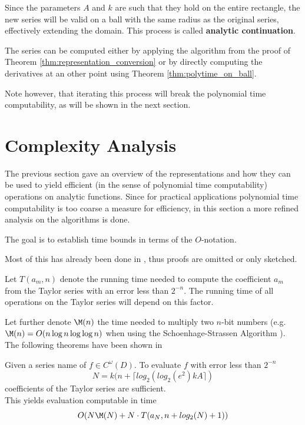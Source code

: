 		Since the parameters $A$ and $k$ are such that they hold on the entire rectangle, 
		the new series will be valid on a ball with the same radius as the original series, effectively extending the domain.
		This process is called \textbf{analytic continuation}.
		
    The series can be computed either by applying the algorithm from the proof
    of Theorem \ref{thm:representation_conversion} or by directly computing the
    derivatives at an other point using Theorem \ref{thm:polytime_on_ball}.

    Note however, that iterating this process will break the polynomial time
    computability, as will be shown in the next
		section.
	\section{Complexity Analysis}
		The previous section gave an overview of the representations and how they can be used to yield efficient 
    (in the sense of polynomial time computability)	operations on analytic functions.
		Since for practical applications polynomial time computability is too coarse a measure for efficiency, 
		in this section a more refined analysis on the algorithms is done. 

		The goal is to establish time bounds in terms of the $O$-notation.
		
		Most of this has already been done in \cite{analyticpaper}, thus proofs are omitted or only sketched.

		Let $T(a_m, n)$ denote the running time needed to compute the coefficient $a_m$ from the Taylor series with an error 
		less than $2^{-n}$.
		The running time of all operations on the Taylor series will depend on this factor.

    Let further denote $\M(n)$ the time needed to multiply two $n$-bit numbers
    (e.g. $\M(n) = O(n\log n \log \log n)$ when using the Schoenhage-Strassen
    Algorithm \cite{Schonhage1971}). 	
    The following theorems have been shown in \cite{analyticpaper}
    \begin{theorem}
			Given a series name of $f \in C^\omega(D)$.
			To evaluate $f$ with error less than $2^{-n}$ 
			$$N = k(n+\lceil log_2(log_2 (e^2) kA \rceil)$$
			coefficients of the Taylor series are sufficient. \\
			This yields evaluation computable in time 
			$$ O(N\M(N)+N \cdot T(a_N, n+log_2(N)+1)) $$ 
		\end{theorem}

